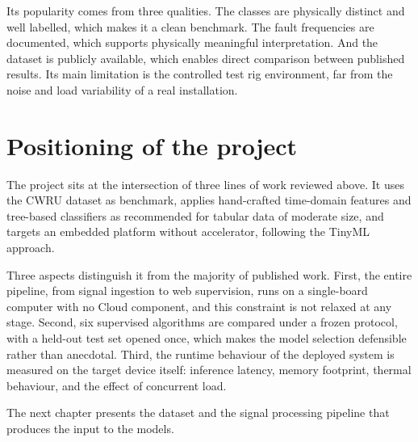 Its popularity comes from three qualities. The classes are physically distinct and well labelled, which makes it a clean benchmark. The fault frequencies are documented, which supports physically meaningful interpretation. And the dataset is publicly available, which enables direct comparison between published results. Its main limitation is the controlled test rig environment, far from the noise and load variability of a real installation.

\section{Positioning of the project}

The project sits at the intersection of three lines of work reviewed above. It uses the CWRU dataset as benchmark, applies hand-crafted time-domain features and tree-based classifiers as recommended for tabular data of moderate size, and targets an embedded platform without accelerator, following the TinyML approach.

Three aspects distinguish it from the majority of published work. First, the entire pipeline, from signal ingestion to web supervision, runs on a single-board computer with no Cloud component, and this constraint is not relaxed at any stage. Second, six supervised algorithms are compared under a frozen protocol, with a held-out test set opened once, which makes the model selection defensible rather than anecdotal. Third, the runtime behaviour of the deployed system is measured on the target device itself: inference latency, memory footprint, thermal behaviour, and the effect of concurrent load.

The next chapter presents the dataset and the signal processing pipeline that produces the input to the models.